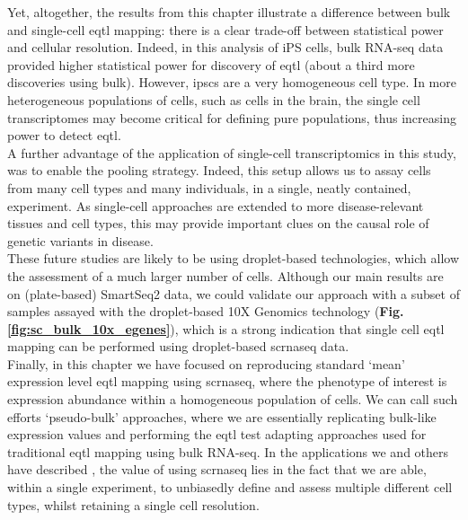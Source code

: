 Yet, altogether, the results from this chapter illustrate a difference between bulk and single-cell \gls{eqtl} mapping: there is a clear trade-off between statistical power and cellular resolution. 
Indeed, in this analysis of iPS cells, bulk RNA-seq data provided higher statistical power for discovery of \gls{eqtl} (about a third more discoveries using bulk). 
However, \glspl{ipsc} are a very homogeneous cell type.
In more heterogeneous populations of cells, such as cells in the brain, the single cell transcriptomes may become critical for defining pure populations, thus increasing power to detect \gls{eqtl}.\\

A further advantage of the application of single-cell transcriptomics in this study, was to enable the pooling strategy. 
Indeed, this setup allows us to assay cells from many cell types and many individuals, in a single, neatly contained, experiment.
As single-cell approaches are extended to more disease-relevant tissues and cell types, this may provide important clues on the causal role of genetic variants in disease. \\

These future studies are likely to be using droplet-based technologies, which allow the assessment of a much larger number of cells.
Although our main results are on (plate-based) SmartSeq2 data, we could validate our approach with a subset of samples assayed with the droplet-based 10X Genomics technology (\textbf{Fig. \ref{fig:sc_bulk_10x_egenes}}), which is a strong indication that single cell \gls{eqtl} mapping can be performed using droplet-based \gls{scrnaseq} data. \\

Finally, in this chapter we have focused on reproducing standard `mean' expression level \gls{eqtl} mapping using \gls{scrnaseq}, where the phenotype of interest is expression abundance within a homogeneous population of cells.
We can call such efforts `pseudo-bulk' approaches, where we are essentially replicating bulk-like expression values and performing the \gls{eqtl} test adapting approaches used for traditional \gls{eqtl} mapping using bulk RNA-seq. 
In the applications we and others have described \cite{van2018single,cuomo2020single}, the value of using \gls{scrnaseq} lies in the fact that we are able, within a single experiment, to unbiasedly define and assess multiple different cell types, whilst retaining a single cell resolution.\\

